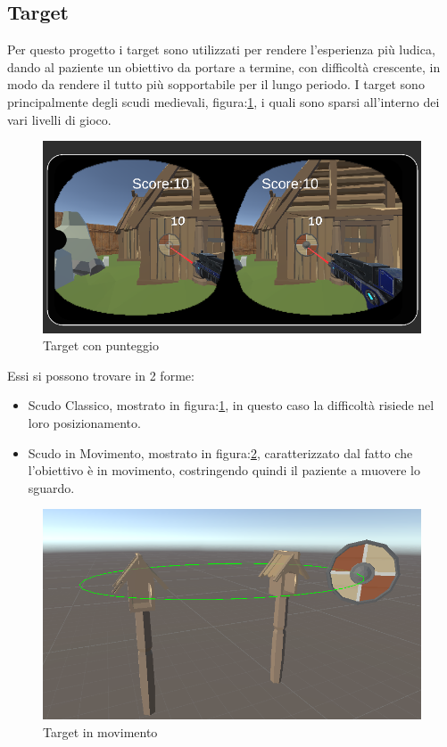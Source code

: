\documentclass[
a4paper,
cleardoublepage=empty,
headings=twolinechapter,
numbers=autoenddot,
]{scrbook}
\begin{document}
	\subsection{Target}
	Per questo progetto i target sono utilizzati per rendere l'esperienza più ludica, dando al paziente un obiettivo da portare a termine, con difficoltà crescente, in modo da rendere il tutto più sopportabile per il lungo periodo.
	I target sono principalmente degli scudi medievali, figura:\ref{fig:target_score}, i quali sono sparsi all'interno dei vari livelli di gioco.
	\begin{figure}[H]
		\centering
		\includegraphics[width=0.7\linewidth]{image/target_score}
		\caption{Target con punteggio}
		\label{fig:target_score}
	\end{figure}
	Essi si possono trovare in 2 forme:
	\begin{itemize}
		\item Scudo Classico, mostrato in figura:\ref{fig:target_score}, in questo caso la difficoltà risiede nel loro posizionamento.
		\item Scudo in Movimento, mostrato in figura:\ref{fig:target_movimento}, caratterizzato dal fatto che l'obiettivo è in movimento, costringendo quindi il paziente a muovere lo sguardo.
	\end{itemize}
	\begin{figure}[H]
		\centering
		\includegraphics[width=0.7\linewidth]{image/target_movimento}
		\caption{Target in movimento}
		\label{fig:target_movimento}
	\end{figure}
\end{document}
